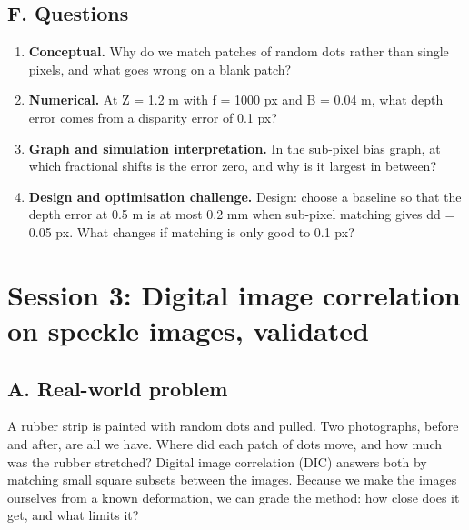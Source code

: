 \documentclass[11pt,a4paper]{article}
\begin{document}
\subsection*{F. Questions}
\begin{enumerate}[nosep]
\item \textbf{Conceptual.} Why do we match patches of random dots rather than single pixels, and what goes wrong on a blank patch?
\item \textbf{Numerical.} At Z = 1.2 m with f = 1000 px and B = 0.04 m, what depth error comes from a disparity error of 0.1 px?
\item \textbf{Graph and simulation interpretation.} In the sub-pixel bias graph, at which fractional shifts is the error zero, and why is it largest in between?
\item \textbf{Design and optimisation challenge.} Design: choose a baseline so that the depth error at 0.5 m is at most 0.2 mm when sub-pixel matching gives dd = 0.05 px. What changes if matching is only good to 0.1 px?
\end{enumerate}

\section{Session 3: Digital image correlation on speckle images, validated}

\subsection*{A. Real-world problem}
A rubber strip is painted with random dots and pulled. Two photographs, before and after, are all we have. Where did each patch of dots move, and how much was the rubber stretched? Digital image correlation (DIC) answers both by matching small square subsets between the images. Because we make the images ourselves from a known deformation, we can grade the method: how close does it get, and what limits it?
\end{document}
